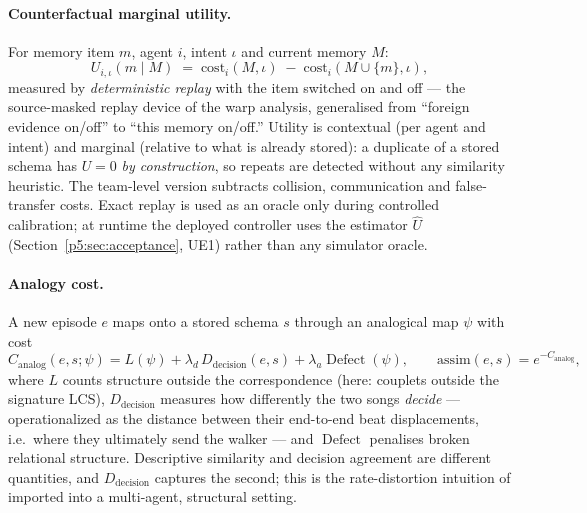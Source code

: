 \documentclass{article}
\begin{document}
\paragraph{Counterfactual marginal utility.} For memory item $m$,
agent $i$, intent $\iota$ and current memory $M$:
\[
U_{i,\iota}(m \mid M) \;=\;
\mathrm{cost}_i(M, \iota) \;-\; \mathrm{cost}_i(M \cup \{m\}, \iota),
\]
measured by \emph{deterministic replay} with the item switched on and
off --- the source-masked replay device of the warp analysis,
generalised from ``foreign evidence on/off'' to ``this memory
on/off.'' Utility is contextual (per agent and intent) and marginal
(relative to what is already stored): a duplicate of a stored schema
has $U = 0$ \emph{by construction}, so repeats are detected without
any similarity heuristic. The team-level version subtracts collision,
communication and false-transfer costs. Exact replay is used as an
oracle only during controlled calibration; at runtime the deployed
controller uses the estimator $\widehat U$
(Section~\ref{p5:sec:acceptance}, UE1) rather than any simulator
oracle.

\paragraph{Analogy cost.} A new episode $e$ maps onto a stored schema
$s$ through an analogical map $\psi$ with cost
\[
C_{\mathrm{analog}}(e,s;\psi) = L(\psi) + \lambda_d\,
D_{\mathrm{decision}}(e,s) + \lambda_a \operatorname{Defect}(\psi),
\qquad \mathrm{assim}(e,s) = e^{-C_{\mathrm{analog}}},
\]
where $L$ counts structure outside the correspondence (here: couplets
outside the signature LCS), $D_{\mathrm{decision}}$ measures how
differently the two songs \emph{decide} --- operationalized as the
distance between their end-to-end beat displacements, i.e.\ where
they ultimately send the walker --- and $\operatorname{Defect}$
penalises broken relational structure. Descriptive similarity and
decision agreement are different quantities, and
$D_{\mathrm{decision}}$ captures the second; this is the
rate-distortion intuition of \citet{rdd2026} imported into a
multi-agent, structural setting.
\end{document}

